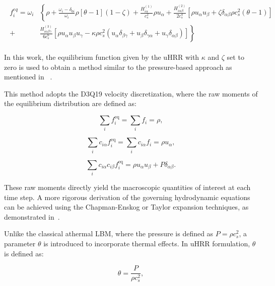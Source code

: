 \begin{align}
	\begin{split}
		f_{i}^{eq} = \omega_{i} & \left\{ \rho + \frac{\omega_{i} - \delta_{0i}}{\omega_{i}} \rho \left[ \theta - 1 \right] (1 - \zeta) + \frac{H_{i\alpha}^{(1)}}{c_{s}^{2}} \rho u_{\alpha} + \frac{H_{i\alpha\beta}^{(2)}}{2c_{s}^{4}} \left[ \rho u_{\alpha} u_{\beta} + \zeta \delta_{\alpha\beta} \rho c_{s}^{2} (\theta - 1) \right] \right.\\ 
		+ &  \left.  \frac{H_{i\alpha\beta\gamma}^{(3)}}{6c_{s}^{6}} \left[ \rho u_{\alpha} u_{\beta} u_{\gamma} - \kappa \rho c_{s}^{2} (u_{\alpha} \delta_{\beta\gamma} + u_{\beta} \delta_{\gamma\alpha} + u_{\gamma} \delta_{\alpha\beta}) \right] \right\}
	\end{split}
\end{align}

In this work, the equilibrium function given by the uHRR with $\kappa$ and
$\zeta$ set to zero is used to obtain a method similar to the pressure-based
approach as mentioned in ~\cite{farag2021unified}.

This method adopts the D3Q19 velocity discretization, where the raw moments of
the equilibrium distribution are defined as:

\begin{equation}
    \sum_i f_i^{\mathrm{eq}} = \sum_i f_i = \rho,
\end{equation}

\begin{equation}
    \sum_i c_{i\alpha} f_i^{\mathrm{eq}} = \sum_i c_{i\alpha} f_i = \rho u_{\alpha},
\end{equation}

\begin{equation}
    \sum_i c_{i\alpha} c_{i\beta} f_i^{\mathrm{eq}} = \rho u_{\alpha} u_{\beta} + P \delta_{\alpha\beta}.
\end{equation}

These raw moments directly yield the macroscopic quantities of interest at each time step. A more rigorous derivation of the governing hydrodynamic equations can be achieved using the Chapman-Enskog or Taylor expansion techniques, as demonstrated in~\cite{kruger2017lattice}.

Unlike the classical athermal LBM, where the pressure is defined as \( P = \rho c_s^2 \), a parameter \( \theta \) is introduced to incorporate thermal effects. In uHRR formulation, \( \theta \) is defined as:

\begin{equation}
    \theta = \frac{P}{\rho c_s^2},
\end{equation}

